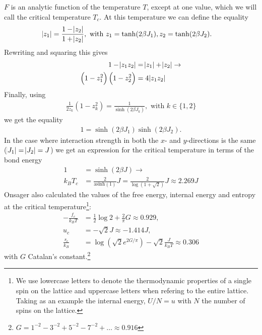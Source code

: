 \documentclass[11pt, a4paper]{report} %
\begin{document}
\(F\) is an analytic function of the temperature \(T\), except at one value, which we will call the critical temperature \(T_c\). At this temperature we can define the equality\cite{mccoy:1973}
\begin{align}
	\abs{z_1} &= \frac{1 - \abs{z_2}}{1+ \abs{z_2}}, \text{ with } z_1 = \tanh(2\beta J_1), z_2 = \tanh(2\beta J_2).
\end{align}
Rewriting and squaring this gives
\begin{align}
	\label{eq:ising_z_functions}
	1 - \abs{z_1 z_2} &= \abs{z_1} + \abs{z_2}\rightarrow\\
	\left(1 - z_1^2 \right) \left(1 - z_2^2 \right) &= 4 \abs{z_1 z_2}
\end{align}
Finally, using
\begin{align}
	\frac{1}{2 z_k}\left(1 - z_k^2\right) = \frac{1}{\sinh(2 \beta J_k)}, \text{ with } k \in \{{1, 2}\}
\end{align}
we get the equality
\begin{align}
	1 = \sinh(2\beta J_1) \sinh(2\beta J_2).
\end{align}
In the case where interaction strength in both the \(x\)- and \(y\)-directions is the same (\(\abs{J_1} = \abs{J_2} = J\)) we get an expression for the critical temperature in terms of the bond energy
\begin{align}
	1 &= \sinh(2\beta J) \to \\
	k_B T_c &= \frac{2}{\text{asinh}(1)}J = \frac{2}{\log(1+\sqrt{2})}J \approx 2.269 J
\end{align}
Onsager \cite{onsager:1944} also calculated the values of the free energy, internal energy and entropy at the critical temperature\footnote{We use lowercase letters to denote the thermodynamic properties of a single spin on the lattice and uppercase letters when refering to the entire lattice. Taking as an example the internal energy, \(U/N = u\) with \(N\) the number of spins on the lattice.}:
\begin{align}
	-\frac{f_c}{k_B T} &= \frac{1}{2} \log{2} + \frac{2}{\pi} G \approx 0.929, \\
	u_c &= - \sqrt{2} J \approx - 1.414 J,\\
	\frac{s_c}{k_B} &= \log{(\sqrt{2} e^{2G/\pi})} - \sqrt{2} \frac{J}{k_B T} \approx 0.306
\end{align}
with \(G\) Catalan's constant.\footnote{\(G = 1^{-2} - 3^{-2} + 5^{-2} - 7^{-2} +\ldots \approx 0.916\)}
\end{document}

